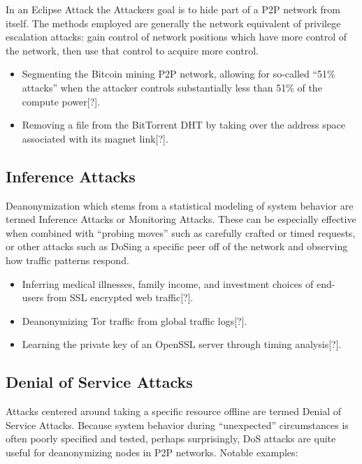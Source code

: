 \documentclass{article}
\begin{document}
In an Eclipse Attack the Attackers goal is to hide part of a P2P network from itself. The methods employed are generally the network equivalent of privilege escalation attacks: gain control of network positions which have more control of the network, then use that control to acquire more control.

\begin{itemize}
    \item Segmenting the Bitcoin mining P2P network, allowing for so-called “51\% attacks” when the attacker controls substantially less than 51\% of the compute power[?].
    \item Removing a file from the BitTorrent DHT by taking over the address space associated with its magnet link[?].
\end{itemize}

\subsection{Inference Attacks}

Deanonymization which stems from a statistical modeling of system behavior are termed Inference Attacks or Monitoring Attacks. These can be especially effective when combined with “probing moves” such as carefully crafted or timed requests, or other attacks such as DoSing a specific peer off of the network and observing how traffic patterns respond.

\begin{itemize}
    \item Inferring medical illnesses, family income, and investment choices of end- users from SSL encrypted web traffic[?].
    \item Deanonymizing Tor traffic from global traffic logs[?].
    \item Learning the private key of an OpenSSL server through timing analysis[?].
\end{itemize}

\subsection{Denial of Service Attacks}

Attacks centered around taking a specific resource offline are termed Denial of Service Attacks. Because system behavior during “unexpected” circumstances is often poorly specified and tested, perhaps surprisingly, DoS attacks are quite useful for deanonymizing nodes in P2P networks. Notable examples:
\end{document}
